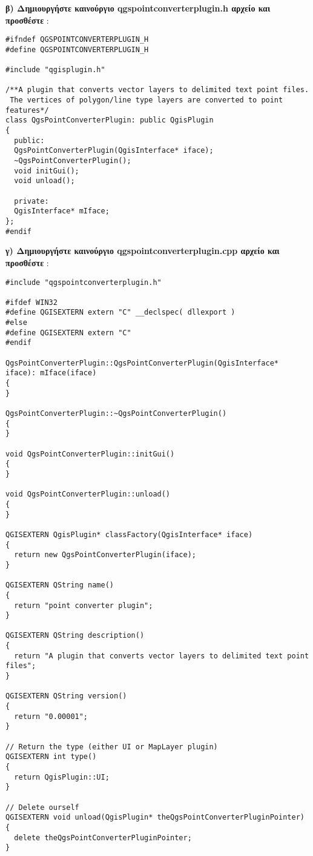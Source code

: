 \textbf{β) Δημιουργήστε καινούργιο qgspointconverterplugin.h αρχείο και προσθέστε }:

\begin{verbatim}
#ifndef QGSPOINTCONVERTERPLUGIN_H
#define QGSPOINTCONVERTERPLUGIN_H

#include "qgisplugin.h"

/**A plugin that converts vector layers to delimited text point files.
 The vertices of polygon/line type layers are converted to point features*/
class QgsPointConverterPlugin: public QgisPlugin
{
  public:
  QgsPointConverterPlugin(QgisInterface* iface);
  ~QgsPointConverterPlugin();
  void initGui();
  void unload();
  
  private:
  QgisInterface* mIface;
};
#endif
\end{verbatim}

\textbf{γ)  Δημιουργήστε καινούργιο qgspointconverterplugin.cpp αρχείο και προσθέστε }:

\begin{verbatim}
#include "qgspointconverterplugin.h"

#ifdef WIN32
#define QGISEXTERN extern "C" __declspec( dllexport )
#else
#define QGISEXTERN extern "C"
#endif

QgsPointConverterPlugin::QgsPointConverterPlugin(QgisInterface* iface): mIface(iface)
{
}

QgsPointConverterPlugin::~QgsPointConverterPlugin()
{
}

void QgsPointConverterPlugin::initGui()
{
}

void QgsPointConverterPlugin::unload()
{
}

QGISEXTERN QgisPlugin* classFactory(QgisInterface* iface)
{
  return new QgsPointConverterPlugin(iface);
}

QGISEXTERN QString name()
{
  return "point converter plugin";
}

QGISEXTERN QString description()
{
  return "A plugin that converts vector layers to delimited text point files";
}

QGISEXTERN QString version()
{
  return "0.00001";
}

// Return the type (either UI or MapLayer plugin)
QGISEXTERN int type()
{
  return QgisPlugin::UI;
}

// Delete ourself
QGISEXTERN void unload(QgisPlugin* theQgsPointConverterPluginPointer)
{
  delete theQgsPointConverterPluginPointer;
}
\end{verbatim}


